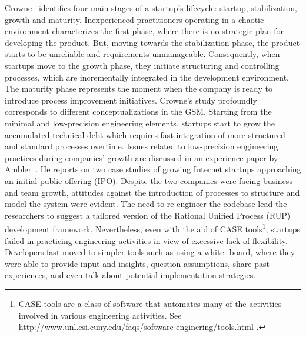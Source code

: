 \documentclass[10pt,journal,letterpaper,compsoc]{IEEEtran}
\begin{document}
Crowne~\cite{Crowne2002} identifies four main stages of a startup's lifecycle:
startup, stabilization, growth and maturity. Inexperienced practitioners
operating in a chaotic environment characterizes the first phase, where there is
no strategic plan for developing the product. But, moving towards the
stabilization phase, the product starts to be unreliable and requirements
unmanageable. Consequently, when startups move to the growth phase, they
initiate structuring and controlling processes, which are incrementally
integrated in the development environment. The maturity phase represents the
moment when the company is ready to introduce process improvement initiatives.
Crowne's study profoundly corresponds to different conceptualizations in the
GSM. Starting from the minimal and low-precision engineering elements, startups
start to grow the accumulated technical debt which requires fast integration of
more structured and standard processes overtime. Issues related to low-precision
engineering practices during companies' growth are discussed in an experience
paper by Ambler~\cite{Ambler2002}. He reports on two case studies of growing
Internet startups approaching an initial public offering (IPO). %
Despite the two companies were facing business and team growth, attitudes 
against the introduction of processes to structure and model the system were 
evident. The need to re-engineer the codebase lead the researchers to suggest a 
tailored version of the Rational Unified Process (RUP)
development framework. Nevertheless, even with the aid of CASE 
tools\footnote{CASE tools are a class of software that automates many of the 
activities involved in various engineering activities.
See \url{http://www.unl.csi.cuny.edu/faqs/software-enginering/tools.html} .},
startups failed in practicing engineering activities in view of excessive lack
of flexibility. Developers fast moved to simpler tools such as using a white-
board, where they were able to provide input and insights, question
assumptions, share past experiences, and even talk about potential
implementation strategies. 
\end{document}
